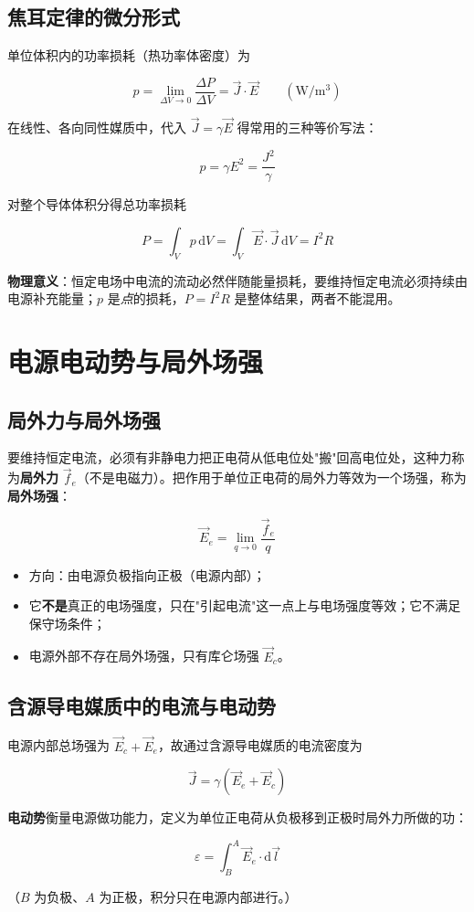 \subsection{焦耳定律的微分形式}
单位体积内的功率损耗（热功率体密度）为
\begin{formulaBox}
\[
p=\lim_{\Delta V\to 0}\frac{\Delta P}{\Delta V}=\vec{J}\cdot\vec{E}
\qquad(\mathrm{W/m^3})
\]
\end{formulaBox}
在线性、各向同性媒质中，代入 $\vec{J}=\gamma\vec{E}$ 得常用的三种等价写法：
\begin{formulaBox}
\[
p=\gamma E^2=\frac{J^2}{\gamma}
\]
\end{formulaBox}
对整个导体体积分得总功率损耗
\begin{formulaBox}
\[
P=\int_V p\,\mathrm{d}V=\int_V \vec{E}\cdot\vec{J}\,\mathrm{d}V=I^2R
\]
\end{formulaBox}
\textbf{物理意义}：恒定电场中电流的流动必然伴随能量损耗，要维持恒定电流必须持续由电源补充能量；$p$ 是\emph{点}的损耗，$P=I^2R$ 是整体结果，两者不能混用。

\section{电源电动势与局外场强}

\subsection{局外力与局外场强}
要维持恒定电流，必须有非静电力把正电荷从低电位处"搬"回高电位处，这种力称为\textbf{局外力} $\vec{f}_e$（不是电磁力）。把作用于单位正电荷的局外力等效为一个场强，称为\textbf{局外场强}：
\begin{formulaBox}
\[
\vec{E}_e=\lim_{q\to 0}\frac{\vec{f}_e}{q}
\]
\end{formulaBox}
\begin{itemize}
  \item 方向：由电源负极指向正极（电源内部）；
  \item 它\textbf{不是}真正的电场强度，只在"引起电流"这一点上与电场强度等效；它不满足保守场条件；
  \item 电源外部不存在局外场强，只有库仑场强 $\vec{E}_c$。
\end{itemize}

\subsection{含源导电媒质中的电流与电动势}
电源内部总场强为 $\vec{E}_c+\vec{E}_e$，故通过含源导电媒质的电流密度为
\begin{formulaBox}
\[
\vec{J}=\gamma(\vec{E}_e+\vec{E}_c)
\]
\end{formulaBox}
\textbf{电动势}衡量电源做功能力，定义为单位正电荷从负极移到正极时局外力所做的功：
\begin{formulaBox}
\[
\varepsilon=\int_{B}^{A}\vec{E}_e\cdot\mathrm{d}\vec{l}
\]
\end{formulaBox}
（$B$ 为负极、$A$ 为正极，积分只在电源内部进行。）

